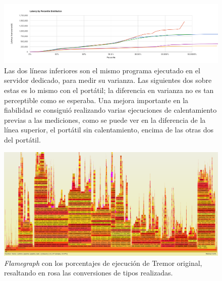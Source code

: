\begin{figure}
    \centering
    \includegraphics[width=\textwidth]{./Imagenes/histogram_variance.png}
    \caption{Las dos líneas inferiores son el mismo programa ejecutado en el
    servidor dedicado, para medir su varianza. Las siguientes dos sobre estas es
    lo mismo con el portátil; la diferencia en varianza no es tan perceptible
    como se esperaba. Una mejora importante en la fiabilidad se consiguió
    realizando varias ejecuciones de calentamiento previas a las mediciones,
    como se puede ver en la diferencia de la línea superior, el portátil sin
    calentamiento, encima de las otras dos del portátil.}%
    \label{fig:histogram_variance}
\end{figure}

\begin{figure}
    \centering
    \includegraphics[width=\textwidth]{./Imagenes/without_value_conv.png}
    \caption{\emph{Flamegraph} con los porcentajes de ejecución de Tremor
    original, resaltando en rosa las conversiones de tipos realizadas.}%
    \label{fig:without_value_conv}
\end{figure}

